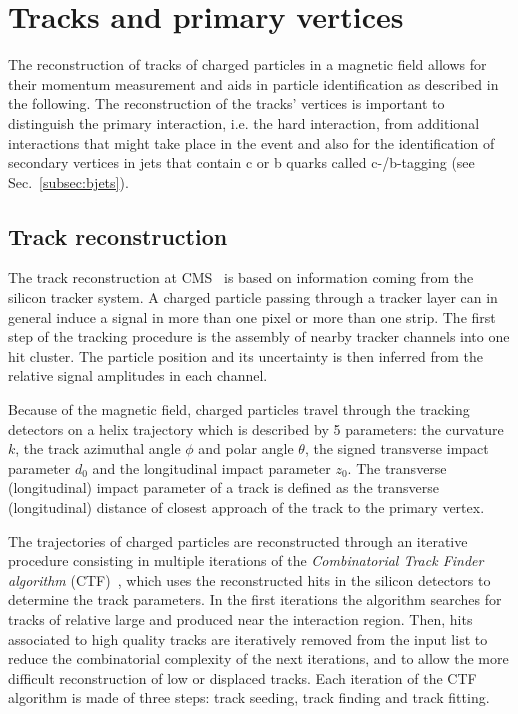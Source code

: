 \section{Tracks and primary vertices}\label{sec:tracksandvtx}

The reconstruction of tracks of charged particles in a magnetic field allows for their momentum measurement and aids in particle identification as described in the following. The reconstruction of the tracks' vertices is important to distinguish the primary interaction, i.e. the hard interaction, from additional interactions that might take place in the event and also for the identification of secondary vertices in jets that contain c or b quarks called c-/b-tagging (see Sec.~\ref{subsec:bjets}).

\subsection{Track reconstruction}\label{subsec:tracks}

The track reconstruction at CMS~\cite{Chatrchyan:2014fea} is based on information coming from the silicon tracker system. A charged particle passing through a tracker layer can in general induce a signal in more than one pixel or more than one strip. The first step of the tracking procedure is the assembly of nearby tracker channels into one hit cluster. The particle position and its uncertainty is then inferred from the relative signal amplitudes in each channel.

Because of the magnetic field, charged particles travel through the tracking detectors on a helix trajectory which is described by 5 parameters: the curvature $k$, the track azimuthal angle $\phi$ and polar angle $\theta$, the signed transverse impact parameter $d_0$ and the longitudinal impact parameter $z_0$. The transverse (longitudinal) impact parameter of a track is defined as the transverse (longitudinal) distance of closest approach of the track to the primary vertex.

The trajectories of charged particles are reconstructed through an iterative procedure consisting in multiple iterations of the \textit{Combinatorial Track Finder algorithm} (CTF)~\cite{Adam:934067}, which uses the reconstructed hits in the silicon detectors to determine the track parameters. In the first iterations the algorithm searches for tracks of relative large \pt and produced near the interaction region. Then, hits associated to high quality tracks are iteratively removed from the input list to reduce the combinatorial complexity of the next iterations, and to allow the more difficult reconstruction of low \pt or displaced tracks. Each iteration of the CTF algorithm is made of three steps: track seeding, track finding and track fitting.

